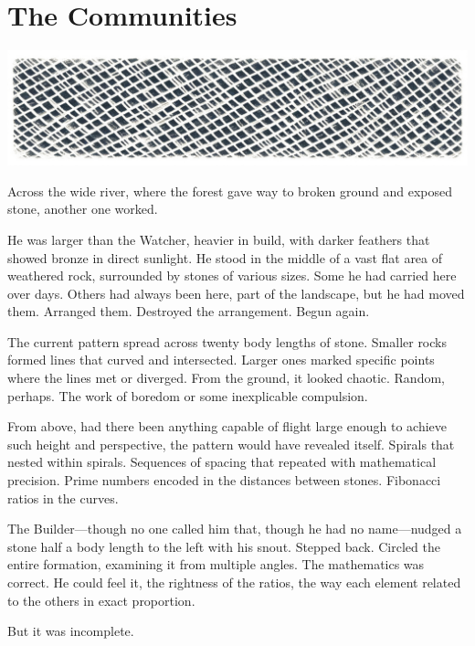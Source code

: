 \chapter{The Communities}
\label{ch:02}



\begin{center}
\includegraphics[width=\textwidth]{images/chapterImages/genesis_sketch_00054_.png}
\end{center}

Across the wide river, where the forest gave way to broken ground and exposed stone, another one worked.

He was larger than the Watcher, heavier in build, with darker feathers that showed bronze in direct sunlight. He stood in the middle of a vast flat area of weathered rock, surrounded by stones of various sizes. Some he had carried here over days. Others had always been here, part of the landscape, but he had moved them. Arranged them. Destroyed the arrangement. Begun again.

The current pattern spread across twenty body lengths of stone. Smaller rocks formed lines that curved and intersected. Larger ones marked specific points where the lines met or diverged. From the ground, it looked chaotic. Random, perhaps. The work of boredom or some inexplicable compulsion.

From above, had there been anything capable of flight large enough to achieve such height and perspective, the pattern would have revealed itself. Spirals that nested within spirals. Sequences of spacing that repeated with mathematical precision. Prime numbers encoded in the distances between stones. Fibonacci ratios in the curves.

The Builder—though no one called him that, though he had no name—nudged a stone half a body length to the left with his snout. Stepped back. Circled the entire formation, examining it from multiple angles. The mathematics was correct. He could feel it, the rightness of the ratios, the way each element related to the others in exact proportion.

But it was incomplete.

